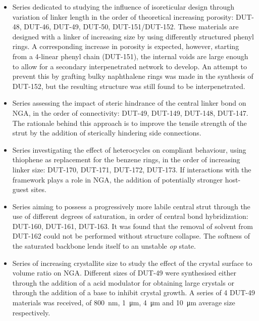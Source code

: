 \begin{itemize}
    \item Series dedicated to studying the influence of isoreticular
    design through variation of linker length in the order of 
    theoretical increasing porosity: DUT-48, DUT-46, DUT-49, 
    DUT-50, DUT-151/DUT-152. These materials are designed 
    with a linker of increasing size by using differently 
    structured phenyl rings. A corresponding increase in 
    porosity is expected, however, starting from a 4-linear
    phenyl chain (DUT-151), the internal voids are large enough to 
    allow for a secondary interpenetrated network to develop.
    An attempt to prevent this by grafting bulky naphthalene 
    rings was made in the synthesis of DUT-152, but the resulting 
    structure was still found to be interpenetrated.
    
    \item Series assessing the impact of steric hindrance of the 
    central linker bond on \gls{NGA}, in the order of connectivity:
    DUT-49, DUT-149, DUT-148, DUT-147. The rationale behind this
    approach is to improve the tensile strength of the strut by 
    the addition of sterically hindering side connections.

    \item Series investigating the effect of heterocycles on compliant
    behaviour, using thiophene as replacement for the benzene rings, 
    in the order of increasing linker size: DUT-170, DUT-171, DUT-172,
    DUT-173. If interactions with the framework plays a role in \gls{NGA},
    the addition of potentially stronger host-guest sites.

    \item Series aiming to possess a progressively more labile central 
    strut through the use of different degrees of saturation,
    in order of central bond hybridization: DUT-160, DUT-161, DUT-163.
    It was found that the removal of solvent from DUT-162 could not be 
    performed without structure collapse. The softness of the saturated
    backbone lends itself to an unstable \textit{op} state.

    \item Series of increasing crystallite size to study the effect 
    of the crystal surface to volume ratio on \gls{NGA}. Different sizes
    of DUT-49 were synthesised either through the addition of a 
    acid modulator for obtaining large crystals or through the addition
    of a base to inhibit crystal growth. A series of 4 DUT-49 materials
    was received, of \SI{800}{\nano\metre}, \SI{1}{\micro\metre},
    \SI{4}{\micro\metre} and \SI{10}{\micro\metre} average size 
    respectively.

\end{itemize}

